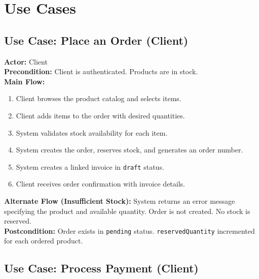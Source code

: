 \documentclass[12pt,a4paper]{report}
\begin{document}
\section{Use Cases}

\subsection{Use Case: Place an Order (Client)}

\begin{tcolorbox}[reqbox,title={UC-01: Place Order}]
\textbf{Actor:} Client \\
\textbf{Precondition:} Client is authenticated. Products are in stock. \\
\textbf{Main Flow:}
\begin{enumerate}[leftmargin=1.5em]
  \item Client browses the product catalog and selects items.
  \item Client adds items to the order with desired quantities.
  \item System validates stock availability for each item.
  \item System creates the order, reserves stock, and generates an order number.
  \item System creates a linked invoice in \texttt{draft} status.
  \item Client receives order confirmation with invoice details.
\end{enumerate}
\textbf{Alternate Flow (Insufficient Stock):} System returns an error message specifying the product and available quantity. Order is not created. No stock is reserved. \\
\textbf{Postcondition:} Order exists in \texttt{pending} status. \texttt{reservedQuantity} incremented for each ordered product.
\end{tcolorbox}

\subsection{Use Case: Process Payment (Client)}
\end{document}
